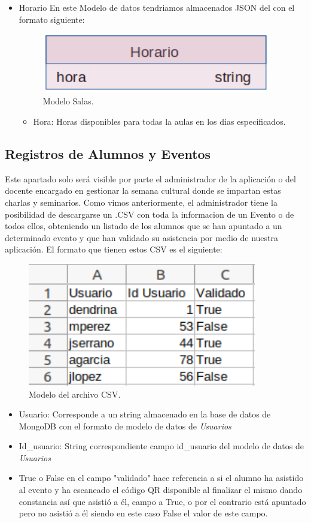 \documentclass[a4paper, 12pt]{book}
\begin{document}
\begin{itemize}
	\item Horario En este Modelo de datos tendriamos almacenados JSON del con el formato siguiente:
	\begin{figure}[H]
  	\centering
  	\includegraphics[width=10cm, keepaspectratio]{img/mongoDBHorario.png}
  	\caption{Modelo Salas.}\label{fig:mongoDBHorario}
	\end{figure}
	\begin{itemize}
		\item Hora: Horas disponibles para todas la aulas en los dias especificados.
	\end{itemize}
\end{itemize}

\subsection{Registros de Alumnos y Eventos}
	Este apartado solo será visible por parte el administrador de la aplicación o del docente encargado en gestionar la semana cultural donde se impartan estas charlas y seminarios. Como vimos anteriormente, el administrador tiene la posibilidad de descargarse un .CSV con toda la informacion de un Evento o de todos ellos, obteniendo un listado de los alumnos que se han apuntado a un determinado evento y que han validado su asistencia por medio de nuestra aplicación.
	El formato que tienen estos CSV es el siguiente:
	\begin{figure}[H]
  	\centering
  	\includegraphics[width=10cm, keepaspectratio]{img/CSVAlumnos.png}
  	\caption{Modelo del archivo CSV.}\label{fig:CSVAlumnos}
	\end{figure}
	\begin{itemize}
		\item Usuario: Corresponde a un string almacenado en la base de datos de MongoDB con el formato de modelo de datos de \textit{Usuarios}
		\item Id\_usuario: String correspondiente campo id\_usuario del modelo de datos de \textit{Usuarios}
		\item True o False en el campo "validado" hace referencia a si el alumno ha asistido al evento y ha escaneado el código QR disponible al finalizar el mismo dando constancia así que asistió a él, campo a True, o por el contrario está apuntado pero no asistió a él siendo en este caso False el valor de este campo.
	\end{itemize}
	
\end{document}
